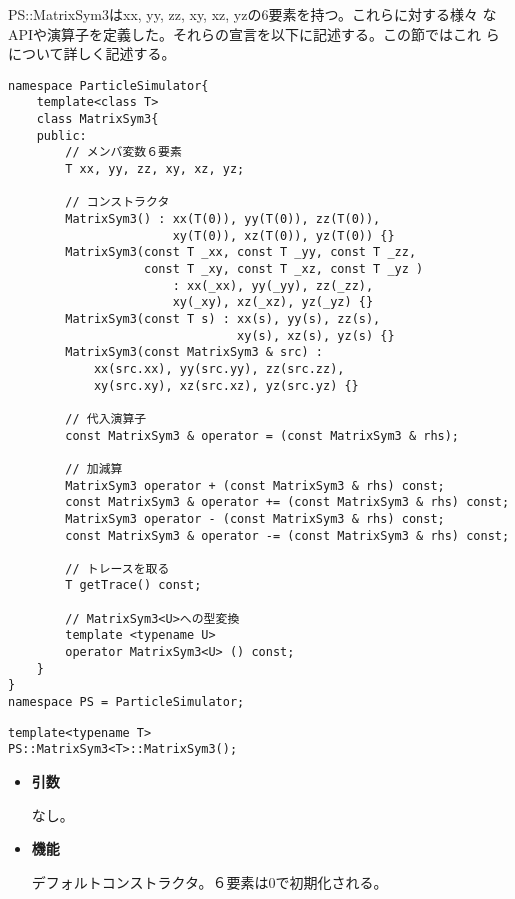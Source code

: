 PS::MatrixSym3はxx, yy, zz, xy, xz, yzの6要素を持つ。これらに対する様々
なAPIや演算子を定義した。それらの宣言を以下に記述する。この節ではこれ
らについて詳しく記述する。
\begin{lstlisting}[caption=MatrixSym3]
namespace ParticleSimulator{
    template<class T>
    class MatrixSym3{
    public:
        // メンバ変数６要素
        T xx, yy, zz, xy, xz, yz;

        // コンストラクタ
        MatrixSym3() : xx(T(0)), yy(T(0)), zz(T(0)),
                       xy(T(0)), xz(T(0)), yz(T(0)) {}
        MatrixSym3(const T _xx, const T _yy, const T _zz,
                   const T _xy, const T _xz, const T _yz )
                       : xx(_xx), yy(_yy), zz(_zz),
                       xy(_xy), xz(_xz), yz(_yz) {}
        MatrixSym3(const T s) : xx(s), yy(s), zz(s),
                                xy(s), xz(s), yz(s) {}
        MatrixSym3(const MatrixSym3 & src) :
            xx(src.xx), yy(src.yy), zz(src.zz),
            xy(src.xy), xz(src.xz), yz(src.yz) {}

        // 代入演算子
        const MatrixSym3 & operator = (const MatrixSym3 & rhs);

        // 加減算
        MatrixSym3 operator + (const MatrixSym3 & rhs) const;
        const MatrixSym3 & operator += (const MatrixSym3 & rhs) const;
        MatrixSym3 operator - (const MatrixSym3 & rhs) const;
        const MatrixSym3 & operator -= (const MatrixSym3 & rhs) const;

        // トレースを取る
        T getTrace() const;

        // MatrixSym3<U>への型変換
        template <typename U>
        operator MatrixSym3<U> () const;
    }
}
namespace PS = ParticleSimulator;
\end{lstlisting}


\begin{screen}
\begin{verbatim}
template<typename T>
PS::MatrixSym3<T>::MatrixSym3();
\end{verbatim}
\end{screen}

\begin{itemize}

\item{{\bf 引数}}

なし。

\item{{\bf 機能}}

デフォルトコンストラクタ。６要素は0で初期化される。

\end{itemize}

